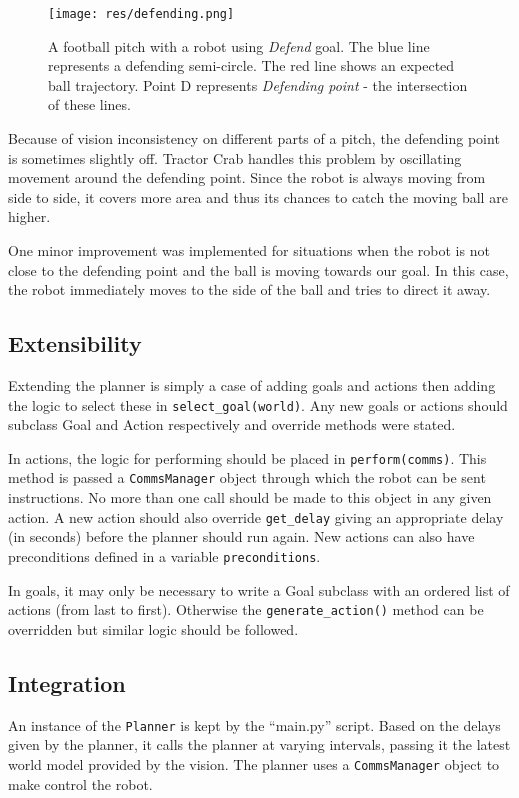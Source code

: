 \begin{figure}[H]
	\begin{center}
    \texttt{[image: res/defending.png]}
    \caption{A football pitch with a robot using \emph{Defend} goal. The blue line represents a defending semi-circle. The red line shows an expected ball trajectory. Point D represents \emph{Defending point} - the intersection of these lines.}
    \label{fig:defendingpoint}
	\end{center}
\end{figure}

Because of vision inconsistency on different parts of a pitch, the defending point is sometimes slightly off. Tractor Crab handles this problem by oscillating movement around the defending point. Since the robot is always moving from side to side, it covers more area and thus its chances to catch the moving ball are higher.

One minor improvement was implemented for situations when the robot is not close to the defending point and the ball is moving towards our goal. In this case, the robot immediately moves to the side of the ball and tries to direct it away.

\subsection{Extensibility}

Extending the planner is simply a case of adding goals and actions then adding
the logic to select these in \texttt{select\_goal(world)}. Any new goals or
actions should subclass Goal and Action respectively and override methods were
stated.

In actions, the logic for performing should be placed in
\texttt{perform(comms)}. This method is passed a \texttt{CommsManager} object
through which the robot can be sent instructions. No more than one call should
be made to this object in any given action. A new action should also override
\texttt{get\_delay} giving an appropriate delay (in seconds) before the planner
should run again. New actions can also have preconditions defined in a variable
\texttt{preconditions}.

In goals, it may only be necessary to write a Goal subclass with an ordered
list of actions (from last to first). Otherwise the \texttt{generate\_action()}
method can be overridden but similar logic should be followed.

\subsection{Integration}

An instance of the \texttt{Planner} is kept by the ``main.py'' script. Based on
the delays given by the planner, it calls the planner at varying intervals,
passing it the latest world model provided by the vision. The planner uses a
\texttt{CommsManager} object to make control the robot.
